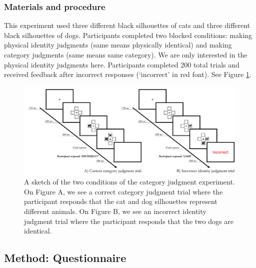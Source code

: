 \documentclass[
  man,a4paper,floatsintext]{apa6}
\begin{document}
\hypertarget{materials-and-procedure-3}{%
\subsubsection{Materials and procedure}\label{materials-and-procedure-3}}

This experiment used three different black silhouettes of cats and three different black silhouettes of dogs.
Participants completed two blocked conditions: making physical identity judgments (same means physically identical) and making category judgments (same means same category). We are only interested in the physical identity judgments here. Participants completed 200 total trials and received feedback after incorrect responses (`incorrect' in red font). See Figure \ref{fig:same-diff-procedure}.

\begin{figure}[!ht]
\includegraphics[width=1\linewidth]{../figures/samedifferent} \caption{A sketch of the two conditions of the category judgment experiment. On Figure A, we see a correct category judgment trial where the participant responds that the cat and dog silhouettes represent different animals. On Figure B, we see an incorrect identity judgment trial where the participant responds that the two dogs are identical.}\label{fig:same-diff-procedure}
\end{figure}

\hypertarget{method-questionnaire}{%
\subsection{Method: Questionnaire}\label{method-questionnaire}}
\end{document}
